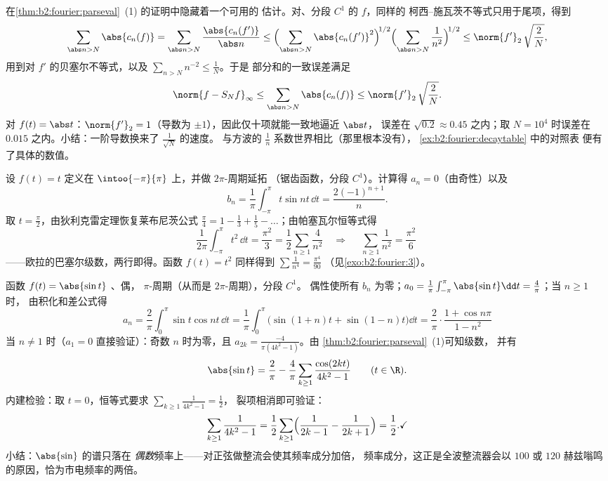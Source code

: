 \begin{example}[$C^1$ 尾项估计的定量化]\label{ex:b2:fourier:tailbound}
在\cref{thm:b2:fourier:parseval}~(1) 的证明中隐藏着一个可用的
估计。对、分段 $C^1$ 的 $f$，同样的
柯西–施瓦茨不等式只用于尾项，得到
\[
\sum_{\abs n > N}\abs{c_n(f)}
= \sum_{\abs n > N}\frac{\abs{c_n(f')}}{\abs n}
\leq \Bigl(\sum_{\abs n > N}\abs{c_n(f')}^2\Bigr)^{\!1/2}
\Bigl(\sum_{\abs n>N}\frac{1}{n^2}\Bigr)^{\!1/2}
\leq \norm{f'}_2\,\sqrt{\frac{2}{N}} ,
\]
用到对 $f'$ 的贝塞尔不等式，以及 $\sum_{n>N}n^{-2} \leq \frac1N$。于是
部分和的一致误差满足
\[
\norm{f - S_Nf}_\infty
\leq \sum_{\abs n>N}\abs{c_n(f)}
\leq \norm{f'}_2\,\sqrt{\frac2N} .
\]
对 $f(t) = \abs t$：$\norm{f'}_2 = 1$（导数为
$\pm1$），因此仅十项就能一致地逼近 $\abs t$，
误差在 $\sqrt{0.2} \approx 0.45$ 之内；取 $N = 10^4$ 时误差在
$0.015$ 之内。小结：一阶导数换来了
$\frac{1}{\sqrt N}$ 的速度。
与方波的 $\frac1n$ 系数世界相比（那里根本没有），
\cref{ex:b2:fourier:decaytable} 中的对照表
便有了具体的数值。
\end{example}

\begin{example}[巴塞尔问题及相关结果]\label{ex:b2:fourier:basel}
设 $f(t) = t$ 定义在 $\intoo{-\pi}{\pi}$ 上，并做 $2\pi$-周期延拓
（锯齿函数，分段 $C^1$）。计算得 $a_n = 0$（由奇性）以及
\[
b_n = \frac{1}{\pi}\int_{-\pi}^{\pi} t\sin nt\,\dd t
= \frac{2(-1)^{n+1}}{n} .
\]
取 $t = \frac\pi2$，由狄利克雷定理恢复莱布尼茨公式 $\frac\pi4 = 1 -
\frac13 + \frac15 - \dots$；由帕塞瓦尔恒等式得
\[
\frac{1}{2\pi}\int_{-\pi}^{\pi} t^2\,\dd t = \frac{\pi^2}{3}
= \frac12\sum_{n\geq1}\frac{4}{n^2}
\quad\Longrightarrow\quad
\boxed{\;\sum_{n\geq1}\frac{1}{n^2} = \frac{\pi^2}{6}\;}
\]
——欧拉的巴塞尔级数，两行即得。函数 $f(t) = t^2$
同样得到 $\sum \frac1{n^4} = \frac{\pi^4}{90}$
（见\cref{exo:b2:fourier:3}）。
\end{example}

\begin{example}\label{ex:b2:fourier:abssin}
函数 $f(t) = \abs{\sin t}$ 、偶，
$\pi$-周期（从而是 $2\pi$-周期），分段 $C^1$。
偶性使所有 $b_n$ 为零；$a_0 = \frac1\pi\int_{-\pi}^{\pi}
\abs{\sin t}\dd t = \frac4\pi$；当 $n \geq 1$ 时，
由积化和差公式得
\[
a_n = \frac2\pi\int_0^\pi \sin t\cos nt\,\dd t
= \frac{1}{\pi}\int_0^\pi\bigl(\sin(1+n)t +
\sin(1-n)t\bigr)\dd t
= \frac2\pi\cdot\frac{1 + \cos n\pi}{1 - n^2}
\]
当 $n \neq 1$ 时（$a_1 = 0$ 直接验证）：奇数 $n$ 时为零，且
$a_{2k} = \frac{-4}{\pi(4k^2-1)}$。由
\cref{thm:b2:fourier:parseval}~(1)可知级数，
并有
\[
\abs{\sin t} = \frac{2}{\pi} - \frac{4}{\pi}
\sum_{k\geq1}\frac{\cos(2kt)}{4k^2 - 1}
\qquad (t \in \R) .
\]
内建检验：取 $t = 0$，恒等式要求
$\sum_{k\geq1}\frac{1}{4k^2-1} = \frac12$，
裂项相消即可验证：
\[
\sum_{k\geq1}\frac{1}{4k^2-1}
= \frac12\sum_{k\geq1}\Bigl(\frac{1}{2k-1} -
\frac{1}{2k+1}\Bigr) = \frac12 . \checkmark
\]
小结：$\abs{\sin}$ 的谱只落在
\emph{偶数}频率上——对正弦做整流会使其频率成分加倍，
频率成分，这正是全波整流器会以
$100$ 或 $120$ 赫兹嗡鸣的原因，恰为市电频率的两倍。
\end{example}

